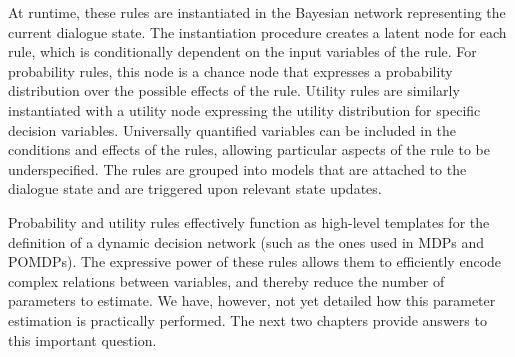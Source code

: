 At runtime, these rules are instantiated in the Bayesian network representing the current dialogue state. The instantiation procedure creates a latent node for each rule, which is conditionally dependent on the input variables of the rule.  For probability rules, this node is a chance node that expresses a probability distribution over the possible effects of the rule. Utility rules are similarly instantiated with a utility node expressing the utility distribution for specific decision variables.  Universally quantified variables can be included in the conditions and effects of the rules, allowing particular aspects of the rule to be underspecified. The rules are grouped into models that are attached to the dialogue state and are triggered upon relevant state updates. 

Probability and utility rules effectively function as high-level templates for the definition of a dynamic decision network (such as the ones used in MDPs and POMDPs). The expressive power of these rules allows them to efficiently encode complex relations between variables, and thereby reduce the number of parameters to estimate.  We have, however, not yet detailed how this parameter estimation is practically performed. The next two chapters provide answers to this important question. 
